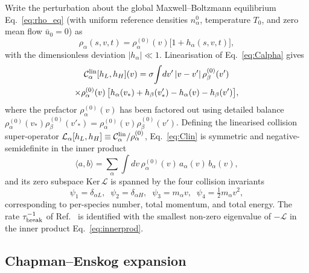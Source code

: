 \documentclass[aps,pre,twocolumn,superscriptaddress,longbibliography,floatfix]{revtex4-2}
\begin{document}
Write the perturbation about the global Maxwell--Boltzmann
equilibrium Eq.~\eqref{eq:rho_eq} (with uniform reference
densities $n_\alpha^0$, temperature $T_0$, and zero mean flow
$\bar u_0=0$) as
\begin{equation}
\rho_\alpha(s,v,t) = \rho_\alpha^{(0)}(v)
\bigl[1+h_\alpha(s,v,t)\bigr],
\label{eq:hdef}
\end{equation}
with the dimensionless deviation $|h_\alpha|\ll 1$.
Linearisation of Eq.~\eqref{eq:Calpha} gives
\begin{multline}
\mathcal{C}_\alpha^{\rm lin}[h_L,h_H](v)
= \sigma\!\int\!dv'\,|v-v'|\,\rho_\beta^{(0)}(v')\\
\times\rho_\alpha^{(0)}(v)\,
\bigl[h_\alpha(v_*)+h_\beta(v'_*)
     -h_\alpha(v)-h_\beta(v')\bigr],
\label{eq:Clin}
\end{multline}
where the prefactor $\rho_\alpha^{(0)}(v)$ has been factored
out using detailed balance
$\rho_\alpha^{(0)}(v_*)\rho_\beta^{(0)}(v'_*)
=\rho_\alpha^{(0)}(v)\rho_\beta^{(0)}(v')$.
Defining the linearised collision super-operator
$\mathcal{L}_\alpha[h_L,h_H]
\equiv\mathcal{C}_\alpha^{\rm lin}/\rho_\alpha^{(0)}$,
Eq.~\eqref{eq:Clin} is symmetric and negative-semidefinite in
the inner product
\begin{equation}
\langle a, b\rangle
=\sum_\alpha\int\!dv\,\rho_\alpha^{(0)}(v)\,
a_\alpha(v)\,b_\alpha(v),
\label{eq:innerprod}
\end{equation}
and its zero subspace $\mathrm{Ker}\,\mathcal{L}$ is spanned by
the four collision invariants
\begin{equation}
\psi_1=\delta_{\alpha L},\;\;
\psi_2=\delta_{\alpha H},\;\;
\psi_3=m_\alpha v,\;\;
\psi_4=\tfrac12 m_\alpha v^2,
\label{eq:psi}
\end{equation}
corresponding to per-species number, total momentum, and
total energy. The rate $\tau_{\rm break}^{-1}$ of
Ref.~\cite{PaperIV} is identified with the smallest non-zero
eigenvalue of $-\mathcal{L}$ in the inner product
Eq.~\eqref{eq:innerprod}.

\subsection{Chapman--Enskog expansion}
\end{document}
